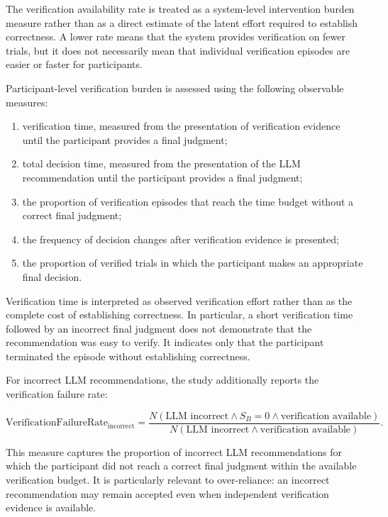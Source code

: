 \documentclass[oneside,final,14pt,a4paper]{extreport}
\theoremstyle{definition}
\theoremstyle{remark}
\begin{document}
The verification availability rate is treated as a system-level intervention
burden measure rather than as a direct estimate of the latent effort required
to establish correctness. A lower rate means that the system provides
verification on fewer trials, but it does not necessarily mean that individual
verification episodes are easier or faster for participants.

Participant-level verification burden is assessed using the following
observable measures:

\begin{enumerate}
    \item verification time, measured from the presentation of verification
    evidence until the participant provides a final judgment;
    \item total decision time, measured from the presentation of the LLM
    recommendation until the participant provides a final judgment;
    \item the proportion of verification episodes that reach the time budget
    without a correct final judgment;
    \item the frequency of decision changes after verification evidence is
    presented;
    \item the proportion of verified trials in which the participant makes an
    appropriate final decision.
\end{enumerate}

Verification time is interpreted as observed verification effort rather than
as the complete cost of establishing correctness. In particular, a short
verification time followed by an incorrect final judgment does not demonstrate
that the recommendation was easy to verify. It indicates only that the
participant terminated the episode without establishing correctness.

For incorrect LLM recommendations, the study additionally reports the
verification failure rate:

\[
\text{VerificationFailureRate}_{\text{incorrect}}
=
\frac{
N(
\text{LLM incorrect}
\land
S_B=0
\land
\text{verification available}
)
}{
N(
\text{LLM incorrect}
\land
\text{verification available}
)
}.
\]

This measure captures the proportion of incorrect LLM recommendations for
which the participant did not reach a correct final judgment within the
available verification budget. It is particularly relevant to over-reliance:
an incorrect recommendation may remain accepted even when independent
verification evidence is available.
\end{document}
